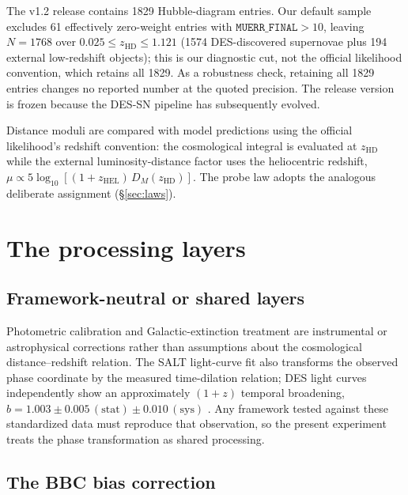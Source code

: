 \documentclass[11pt]{article}
\begin{document}
The v1.2 release contains 1829 Hubble-diagram entries. Our default sample
excludes 61 effectively zero-weight entries with
$\texttt{MUERR\_FINAL} > 10$, leaving $N = 1768$ over
$0.025 \leq z_{\mathrm{HD}} \leq 1.121$ (1574 DES-discovered supernovae
plus 194 external low-redshift objects); this is our diagnostic cut, not
the official likelihood convention, which retains all 1829. As a
robustness check, retaining all 1829 entries changes no reported number at
the quoted precision. The release version is frozen because the DES-SN
pipeline has subsequently evolved.

Distance moduli are compared with model predictions using the official
likelihood's redshift convention: the cosmological integral is evaluated
at $z_{\mathrm{HD}}$ while the external luminosity-distance factor uses
the heliocentric redshift, $\mu \propto
5\log_{10}[(1+z_{\mathrm{HEL}})\,D_M(z_{\mathrm{HD}})]$. The probe law
adopts the analogous deliberate assignment (\S\ref{sec:laws}).

\section{The processing layers}
\label{sec:layers}

\subsection{Framework-neutral or shared layers}

Photometric calibration and Galactic-extinction treatment are instrumental
or astrophysical corrections rather than assumptions about the
cosmological distance--redshift relation. The SALT light-curve fit
\citep{Kenworthy2021} also transforms the observed phase coordinate by the
measured time-dilation relation; DES light curves independently show an
approximately $(1+z)$ temporal broadening, $b = 1.003 \pm 0.005\,
(\mathrm{stat}) \pm 0.010\,(\mathrm{sys})$ \citep{White2024}. Any
framework tested against these standardized data must reproduce that
observation, so the present experiment treats the phase transformation as
shared processing.

\subsection{The BBC bias correction}
\label{sec:bbc}
\end{document}
